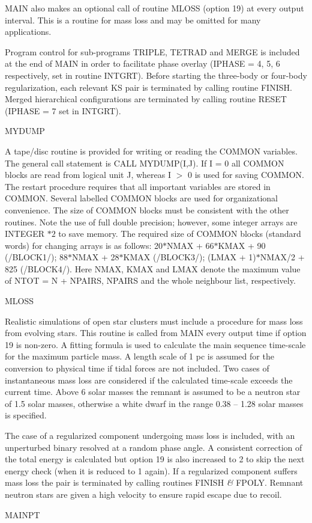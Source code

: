  MAIN also makes an optional call of routine MLOSS (option 19) at every output
 interval.  This is a routine for mass loss and may be omitted for 
 many applications.

   Program control for sub-programs TRIPLE, TETRAD and MERGE is
 included at the end of MAIN in order to facilitate phase overlay
 (IPHASE = 4, 5, 6 respectively, set in routine INTGRT).
 Before starting the three-body or four-body regularization,
 each relevant KS pair is terminated by calling routine FINISH.
 Merged hierarchical configurations are terminated by calling
 routine RESET (IPHASE = 7 set in INTGRT).
\bigskip
\bigskip
\centerline {MYDUMP}
\bigskip

 A tape/disc routine is provided for writing or reading the COMMON
 variables.  The general
 call statement is CALL MYDUMP(I,J).  If I = 0 all COMMON blocks are read
 from logical unit J, whereas I $>$ 0 is used for saving COMMON.  The restart
 procedure requires that all important variables are stored in COMMON.  Several
 labelled COMMON blocks are used for organizational convenience.  The size of
 COMMON blocks must be consistent with the other routines.  Note the use of
 full double precision; however, some   
 integer arrays are INTEGER $\ast2$ to save memory.
 The required size of COMMON blocks (standard words) for changing
 arrays is as follows: 20$\ast$NMAX + 66$\ast$KMAX + 90 (/BLOCK1/);
 88$\ast$NMAX + 28$\ast$KMAX (/BLOCK3/);
 (LMAX + 1)$\ast$NMAX/2 + 825 (/BLOCK4/). Here NMAX, KMAX and LMAX
 denote the maximum value of NTOT = N + NPAIRS, NPAIRS and the
 whole neighbour list, respectively.
\bigskip
\bigskip
\centerline {MLOSS}
\bigskip

 Realistic simulations of open star clusters must include a procedure for mass
 loss from evolving stars.  This routine is called from MAIN every output time if option 19 is
 non-zero.  A fitting formula is used to calculate the main sequence time-scale
 for the maximum particle mass.  A length scale of 1 pc is assumed for the
 conversion to physical time if tidal forces are not included.  Two cases of
 instantaneous mass loss are considered if the calculated time-scale exceeds the
 current time.  Above 6 solar masses the remnant is assumed to be a neutron star
 of 1.5 solar masses, otherwise a white dwarf in the range 0.38 -- 1.28 solar masses is specified.

 The case of a regularized component undergoing mass loss is included, with an
 unperturbed binary resolved at a random phase angle.  A
 consistent correction
 of the total energy is calculated but option 19 is also increased to 2 to skip
 the next energy check (when it is reduced to 1 again).  If a regularized
 component suffers mass loss the pair is terminated by calling routines FINISH
 {\it\&} FPOLY.  Remnant neutron stars are given a high velocity to ensure 
 rapid escape due to recoil.
\bigskip
\bigskip
\centerline {MAINPT}
\bigskip

